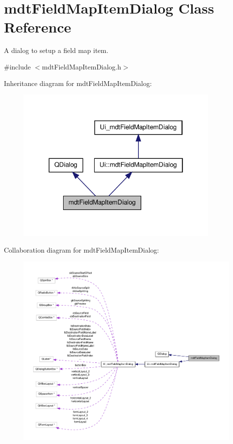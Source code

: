 \hypertarget{classmdt_field_map_item_dialog}{\section{mdt\-Field\-Map\-Item\-Dialog Class Reference}
\label{classmdt_field_map_item_dialog}
}


A dialog to setup a field map item.  




{\ttfamily \#include $<$mdt\-Field\-Map\-Item\-Dialog.\-h$>$}



Inheritance diagram for mdt\-Field\-Map\-Item\-Dialog\-:\nopagebreak
\begin{figure}[H]
\begin{center}
\leavevmode
\includegraphics[width=286pt]{classmdt_field_map_item_dialog__inherit__graph}
\end{center}
\end{figure}


Collaboration diagram for mdt\-Field\-Map\-Item\-Dialog\-:\nopagebreak
\begin{figure}[H]
\begin{center}
\leavevmode
\includegraphics[width=350pt]{classmdt_field_map_item_dialog__coll__graph}
\end{center}
\end{figure}
